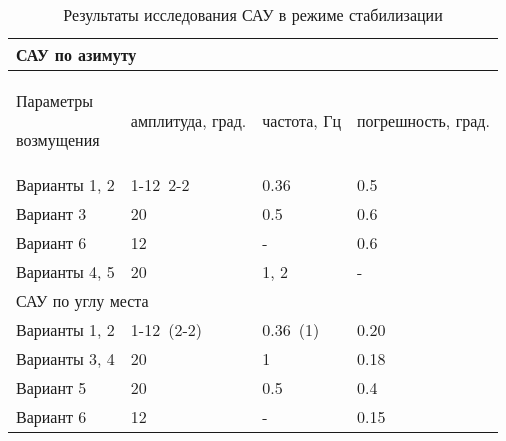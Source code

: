 

\begin{table}[h]
	\centering
	\caption{Результаты исследования САУ в режиме стабилизации}
	\label{tab:stab_summary}
	\begin{tabular}{p{1.28in}p{1.47in}p{1.08in}p{1.67in}}
		\hline
		\multicolumn{4}{|p{6.1in}|}{САУ по азимуту} \\
		\hline
		\multicolumn{1}{|p{1.28in}}{Параметры \par возмущения} & 
		\multicolumn{1}{|p{1.47in}}{амплитуда, град.} & 
		\multicolumn{1}{|p{1.08in}}{частота, Гц} & 
		\multicolumn{1}{|p{1.67in}|}{погрешность, град. } \\
		\hline
		\multicolumn{1}{|p{1.28in}}{Варианты 1, 2} & 
		\multicolumn{1}{|p{1.47in}}{1-12\  2-2} & 
		\multicolumn{1}{|p{1.08in}}{0.36} & 
		\multicolumn{1}{|p{1.67in}|}{0.5} \\
		\hline
		\multicolumn{1}{|p{1.28in}}{Вариант 3} & 
		\multicolumn{1}{|p{1.47in}}{20} & 
		\multicolumn{1}{|p{1.08in}}{0.5} & 
		\multicolumn{1}{|p{1.67in}|}{0.6} \\
		\hline
		\multicolumn{1}{|p{1.28in}}{Вариант 6} & 
		\multicolumn{1}{|p{1.47in}}{12} & 
		\multicolumn{1}{|p{1.08in}}{-} & 
		\multicolumn{1}{|p{1.67in}|}{0.6} \\
		\hline
		\multicolumn{1}{|p{1.28in}}{Варианты 4, 5} & 
		\multicolumn{1}{|p{1.47in}}{20} & 
		\multicolumn{1}{|p{1.08in}}{1, 2} & 
		\multicolumn{1}{|p{1.67in}|}{-} \\
		\hline
		\multicolumn{4}{|p{6.1in}|}{САУ по углу места} \\
		\hline
		\multicolumn{1}{|p{1.37in}}{Варианты 1, 2} & 
		\multicolumn{1}{|p{1.47in}}{ 1-12\  (2-2)} & 
		\multicolumn{1}{|p{1.18in}}{ 0.36\  (1)} & 
		\multicolumn{1}{|p{1.47in}|}{ 0.20} \\
		\hline
		\multicolumn{1}{|p{1.37in}}{Варианты 3, 4} & 
		\multicolumn{1}{|p{1.47in}}{ 20} & 
		\multicolumn{1}{|p{1.18in}}{ 1} & 
		\multicolumn{1}{|p{1.47in}|}{ 0.18} \\
		\hline
		\multicolumn{1}{|p{1.37in}}{Вариант 5} & 
		\multicolumn{1}{|p{1.47in}}{ 20} & 
		\multicolumn{1}{|p{1.18in}}{ 0.5} & 
		\multicolumn{1}{|p{1.47in}|}{ 0.4 } \\
		\hline
		\multicolumn{1}{|p{1.37in}}{Вариант 6} & 
		\multicolumn{1}{|p{1.47in}}{ 12} & 
		\multicolumn{1}{|p{1.18in}}{ -} & 
		\multicolumn{1}{|p{1.47in}|}{ 0.15} \\
		\hline	
	\end{tabular}
\end{table}


